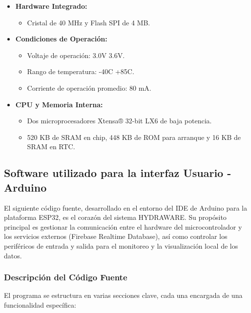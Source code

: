 \documentclass[a4paper,12pt]{article}
\begin{document}
\begin{itemize}
		\item \textbf{Hardware Integrado:}
		\begin{itemize}
			\item Cristal de 40 MHz y Flash SPI de 4 MB.
		\end{itemize}
		
		\item \textbf{Condiciones de Operación:}
		\begin{itemize}
			\item Voltaje de operación: 3.0V 3.6V.
			\item Rango de temperatura: -40C +85C.
			\item Corriente de operación promedio: 80 mA.
		\end{itemize}
		\item \textbf{CPU y Memoria Interna:}
		\begin{itemize}
			\item Dos microprocesadores Xtensa® 32-bit LX6 de baja potencia.
			
			\item 520 KB de SRAM en chip, 448 KB de ROM para arranque y 16 KB de SRAM en RTC.
		\end{itemize}
	\end{itemize}
	
	
	\subsection{Software utilizado para la interfaz Usuario - Arduino}
	El siguiente código fuente, desarrollado en el entorno del IDE de Arduino para la plataforma ESP32, es el corazón del sistema HYDRAWARE. Su propósito principal es gestionar la comunicación entre el hardware del microcontrolador y los servicios externos (Firebase Realtime Database), así como controlar los periféricos de entrada y salida para el monitoreo y la visualización local de los datos.
	
	\subsubsection{Descripción del Código Fuente}
	El programa se estructura en varias secciones clave, cada una encargada de una funcionalidad específica:
	
\end{document}
